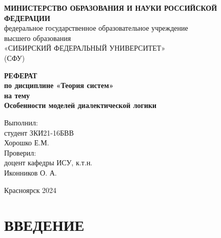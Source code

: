 \documentclass[a4paper,12pt]{report}
\author{}
\renewcommand{\contentsname}{Содержание}
\begin{document}
	
	\title{}
\pagestyle{empty}
	\begin{center}
	 \textbf{МИНИСТЕРСТВО ОБРАЗОВАНИЯ И НАУКИ РОССИЙСКОЙ ФЕДЕРАЦИИ}\\
 федеральное государственное образовательное учреждение\\ высшего образования\\
«СИБИРСКИЙ ФЕДЕРАЛЬНЫЙ УНИВЕРСИТЕТ»\\
(СФУ)\\
\vspace{0.2em}




\end{center}

\vspace{6em}
\begin{center}
	 \bf{ РЕФЕРАТ } \\%
	\vspace{1em} по дисциплине «Теория систем»\\
\vspace{0.5em} на тему \\
\vspace{0.5em} 
\large{Особенности моделей диалектической логики}\\
\end{center}
\vspace{0.5em}
\textsl{}
\vspace{6em}




\begin{flushright}
Выполнил:\\
студент ЗКИ21-16БВВ \\
Хорошко Е.М.\\
\vspace{1.5em}
Проверил:\\
доцент кафедры ИСУ, к.т.н.\\
Иконников О. А.\\
\end{flushright} 
\begin{center}
	\vspace{8em}
	Красноярск 2024
\end{center}

\newpage

\pagestyle{empty} 
\def\contentsname{Содержание}
\tableofcontents

\newpage

\chapter*{ВВЕДЕНИЕ}
 \\
\pagestyle{plain} \\
\end{document}
